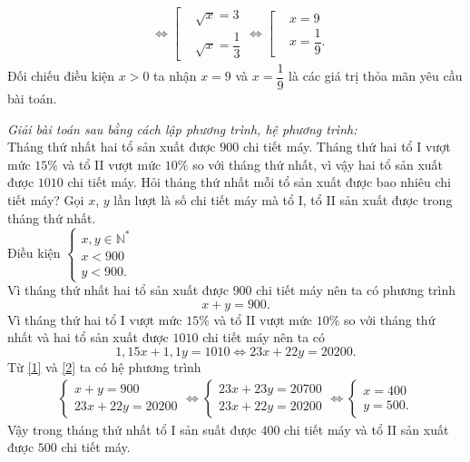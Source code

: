 \begin{ex}
{\begin{enumerate}
\begin{align*}
    & \Leftrightarrow \left[\begin{aligned} & \sqrt{x} = 3 \\& \sqrt{x} = \dfrac{1}{3} \end{aligned}\right. 
     \Leftrightarrow \left[\begin{aligned} & x = 9 \\& x = \dfrac{1}{9}. \end{aligned}\right.
   \end{align*}
   Đối chiếu điều kiện $x > 0$ ta nhận $x = 9$ và $x = \dfrac{1}{9}$ là các giá trị thỏa mãn yêu cầu bài toán.
  \end{enumerate}
  }
\end{ex}

 
\begin{ex}%
 \textit{Giải bài toán sau bằng cách lập phương trình, hệ phương trình:}\\
 Tháng thứ nhất hai tổ sản xuất được $900$ chi tiết máy. Tháng thứ hai tổ I vượt mức $15 \%$ và tổ II vượt mức $10\%$ so với tháng thứ nhất, vì vậy hai tổ sản xuất được $1010$ chi tiết máy. Hỏi tháng thứ nhất mỗi tổ sản xuất được bao nhiêu chi tiết máy?
 \loigiai
  {
  Gọi $x$, $y$ lần lượt là số chi tiết máy mà tổ I, tổ II sản xuất được trong tháng thứ nhất.\\
  Điều kiện $\begin{cases} x, y \in \mathbb{N}^* \\ x < 900 \\ y < 900.  \end{cases}$\\
  Vì tháng thứ nhất hai tổ sản xuất được $900$ chi tiết máy nên ta có phương trình
  \begin{equation}
   x + y = 900. \label{1}
  \end{equation}
  Vì tháng thứ hai tổ I vượt mức $15 \%$ và tổ II vượt mức $10\%$ so với tháng thứ nhất và hai tổ sản xuất được $1010$ chi tiết máy nên ta có
  \begin{equation}
   1{,}15x + 1{,}1y = 1010 \Leftrightarrow 23x + 22y = 20200. \label{2}
  \end{equation}
  Từ \eqref{1} và \eqref{2} ta có hệ phương trình
  \begin{align*}
   \begin{cases} x + y = 900 \\ 23x + 22y = 20200  \end{cases} \Leftrightarrow \begin{cases} 23x + 23y = 20700 \\ 23x + 22y = 20200 \end{cases} \Leftrightarrow \begin{cases} x = 400 \\ y = 500. \end{cases}
  \end{align*}
  Vậy trong tháng thứ nhất tổ I sản suất được $400$ chi tiết máy và tổ II sản xuất được $500$ chi tiết máy.
  }
\end{ex}


